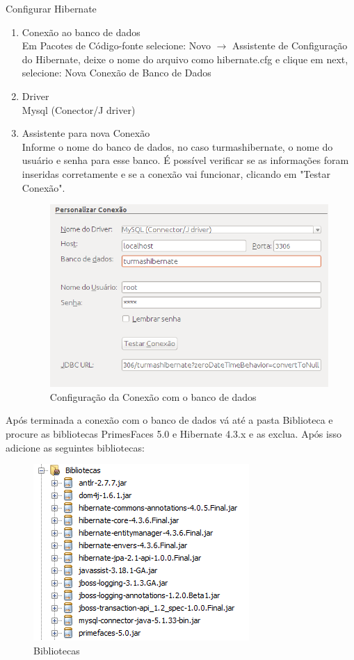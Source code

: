 \documentclass[12pt,a4paper]{article}
\begin{document}
Configurar Hibernate
\begin{enumerate}
\item{Conexão ao banco de dados}\\ %
Em Pacotes de Código-fonte selecione: Novo $\rightarrow$ Assistente de Configuração do Hibernate, deixe o nome do arquivo como hibernate.cfg e clique em next, selecione: Nova Conexão de Banco de Dados
\item{Driver}\\
Mysql (Conector/J driver)
\item{Assistente para nova Conexão}\\
Informe o nome do banco de dados, no caso turmashibernate, o nome do usuário e senha para esse banco. É possível verificar se as informações foram inseridas corretamente e se a conexão vai funcionar, clicando em "Testar Conexão".
\begin{figure}[H]
    \centering
    \includegraphics[scale=0.50]{ConfiguracaoConexao.png}
    \caption{Configuração da Conexão com o banco de dados}
    \label{imagemConfiguracaoConexao}
\end{figure}
\end{enumerate}

Após terminada a conexão com o banco de dados vá até a pasta Biblioteca e procure as bibliotecas PrimesFaces 5.0 e Hibernate 4.3.x e as exclua. Após isso adicione as seguintes bibliotecas:

\begin{figure}[H]
    \centering
    \includegraphics{bibliotecas.PNG}
    \caption{Bibliotecas}
    \label{imagembibliotecas}
\end{figure}
\end{document}
